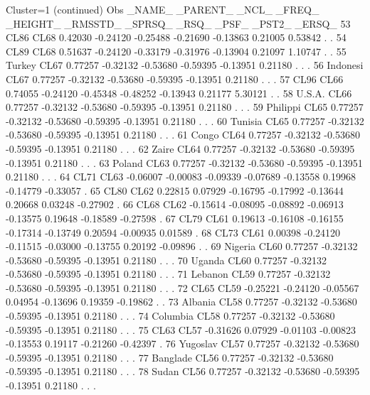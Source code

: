 \documentclass{article}
\begin{document}
\begin{Woutput}
Cluster=1
(continued)
Obs _NAME_   _PARENT_   _NCL_   _FREQ_  _HEIGHT_ _RMSSTD_  _SPRSQ_  _RSQ_    _PSF_   _PST2_  _ERSQ_
 53 CL86       CL68    0.42030 -0.24120 -0.25488 -0.21690 -0.13863 0.21005  0.53842   .         .
 54 CL89       CL68    0.51637 -0.24120 -0.33179 -0.31976 -0.13904 0.21097  1.10747   .         .
 55 Turkey     CL67    0.77257 -0.32132 -0.53680 -0.59395 -0.13951 0.21180   .        .         .
 56 Indonesi   CL67    0.77257 -0.32132 -0.53680 -0.59395 -0.13951 0.21180   .        .         .
 57 CL96       CL66    0.74055 -0.24120 -0.45348 -0.48252 -0.13943 0.21177  5.30121   .         .
 58 U.S.A.     CL66    0.77257 -0.32132 -0.53680 -0.59395 -0.13951 0.21180   .        .         .
 59 Philippi   CL65    0.77257 -0.32132 -0.53680 -0.59395 -0.13951 0.21180   .        .         .
 60 Tunisia    CL65    0.77257 -0.32132 -0.53680 -0.59395 -0.13951 0.21180   .        .         .
 61 Congo      CL64    0.77257 -0.32132 -0.53680 -0.59395 -0.13951 0.21180   .        .         .
 62 Zaire      CL64    0.77257 -0.32132 -0.53680 -0.59395 -0.13951 0.21180   .        .         .
 63 Poland     CL63    0.77257 -0.32132 -0.53680 -0.59395 -0.13951 0.21180   .        .         .
 64 CL71       CL63   -0.06007 -0.00083 -0.09339 -0.07689 -0.13558 0.19968 -0.14779 -0.33057    .
 65 CL80       CL62    0.22815  0.07929 -0.16795 -0.17992 -0.13644 0.20668  0.03248 -0.27902    .
 66 CL68       CL62   -0.15614 -0.08095 -0.08892 -0.06913 -0.13575 0.19648 -0.18589 -0.27598    .
 67 CL79       CL61    0.19613 -0.16108 -0.16155 -0.17314 -0.13749 0.20594 -0.00935  0.01589    .
 68 CL73       CL61    0.00398 -0.24120 -0.11515 -0.03000 -0.13755 0.20192 -0.09896   .         .
 69 Nigeria    CL60    0.77257 -0.32132 -0.53680 -0.59395 -0.13951 0.21180   .        .         .
 70 Uganda     CL60    0.77257 -0.32132 -0.53680 -0.59395 -0.13951 0.21180   .        .         .
 71 Lebanon    CL59    0.77257 -0.32132 -0.53680 -0.59395 -0.13951 0.21180   .        .         .
 72 CL65       CL59   -0.25221 -0.24120 -0.05567  0.04954 -0.13696 0.19359 -0.19862   .         .
 73 Albania    CL58    0.77257 -0.32132 -0.53680 -0.59395 -0.13951 0.21180   .        .         .
 74 Columbia   CL58    0.77257 -0.32132 -0.53680 -0.59395 -0.13951 0.21180   .        .         .
 75 CL63       CL57   -0.31626  0.07929 -0.01103 -0.00823 -0.13553 0.19117 -0.21260 -0.42397    .
 76 Yugoslav   CL57    0.77257 -0.32132 -0.53680 -0.59395 -0.13951 0.21180   .        .         .
 77 Banglade   CL56    0.77257 -0.32132 -0.53680 -0.59395 -0.13951 0.21180   .        .         .
 78 Sudan      CL56    0.77257 -0.32132 -0.53680 -0.59395 -0.13951 0.21180   .        .         .

\end{Woutput}
\end{document}
